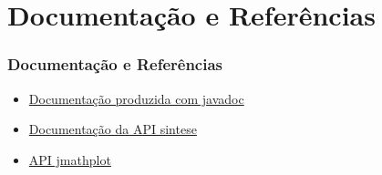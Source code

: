 \documentclass{beamer}
\begin{document}
\section{Documentação e Referências}
\begin{frame}
  \frametitle{Documentação e Referências}
  \begin{itemize}
  \item \href{../doc/index.html}{Documentação produzida com javadoc}
  \item \href{http://www.cic.unb.br/docentes/lcmm/sintese/javadoc/}{Documentação da API sintese}
  \item \href{https://code.google.com/p/jmathplot/}{API jmathplot}
  \end{itemize}
\end{frame}
\end{document}
